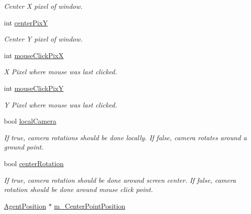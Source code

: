 \begin{DoxyCompactItemize}
\begin{DoxyCompactList}\small\item\em Center X pixel of window. \end{DoxyCompactList}\item 
\hypertarget{class_viewer3_d_ae6324e28366ce610ba858cbbd374b619}{
int \hyperlink{class_viewer3_d_ae6324e28366ce610ba858cbbd374b619}{centerPixY}}
\label{class_viewer3_d_ae6324e28366ce610ba858cbbd374b619}

\begin{DoxyCompactList}\small\item\em Center Y pixel of window. \end{DoxyCompactList}\item 
\hypertarget{class_viewer3_d_af09369830489ca3df0a592e3a64640ea}{
int \hyperlink{class_viewer3_d_af09369830489ca3df0a592e3a64640ea}{mouseClickPixX}}
\label{class_viewer3_d_af09369830489ca3df0a592e3a64640ea}

\begin{DoxyCompactList}\small\item\em X Pixel where mouse was last clicked. \end{DoxyCompactList}\item 
\hypertarget{class_viewer3_d_aabc27ce4f2b4b01d12c95e8585a9b133}{
int \hyperlink{class_viewer3_d_aabc27ce4f2b4b01d12c95e8585a9b133}{mouseClickPixY}}
\label{class_viewer3_d_aabc27ce4f2b4b01d12c95e8585a9b133}

\begin{DoxyCompactList}\small\item\em Y Pixel where mouse was last clicked. \end{DoxyCompactList}\item 
\hypertarget{class_viewer3_d_a6502014282ef0d7fb6793a2fa56f5a7a}{
bool \hyperlink{class_viewer3_d_a6502014282ef0d7fb6793a2fa56f5a7a}{localCamera}}
\label{class_viewer3_d_a6502014282ef0d7fb6793a2fa56f5a7a}

\begin{DoxyCompactList}\small\item\em If true, camera rotations should be done locally. If false, camera rotates around a ground point. \end{DoxyCompactList}\item 
\hypertarget{class_viewer3_d_a47c7b5407329e424fa69a4f5d63f0516}{
bool \hyperlink{class_viewer3_d_a47c7b5407329e424fa69a4f5d63f0516}{centerRotation}}
\label{class_viewer3_d_a47c7b5407329e424fa69a4f5d63f0516}

\begin{DoxyCompactList}\small\item\em If true, camera rotation should be done around screen center. If false, camera rotation should be done around mouse click point. \end{DoxyCompactList}\item 
\hypertarget{class_viewer3_d_a199e8547c686d6fb8f52deec9f1757d4}{
\hyperlink{class_agent_position}{AgentPosition} $\ast$ \hyperlink{class_viewer3_d_a199e8547c686d6fb8f52deec9f1757d4}{m\_\-CenterPointPosition}}
\label{class_viewer3_d_a199e8547c686d6fb8f52deec9f1757d4}


\end{DoxyCompactItemize}
